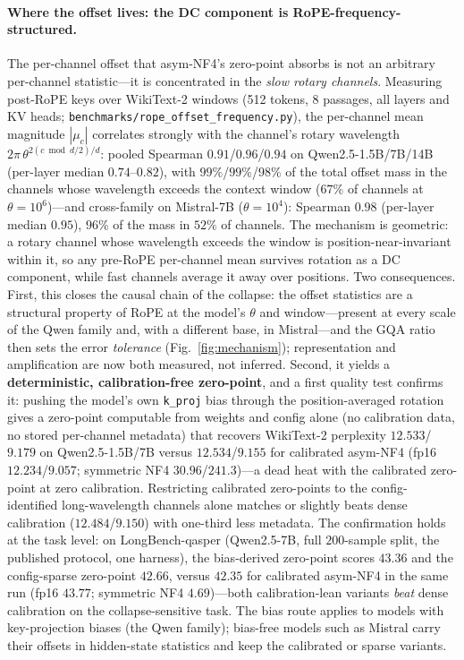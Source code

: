 \documentclass[11pt]{article}
\begin{document}
\paragraph{Where the offset lives: the DC component is RoPE-frequency-structured.}
The per-channel offset that asym-NF4's zero-point absorbs is not an arbitrary
per-channel statistic---it is concentrated in the \emph{slow rotary channels}.
Measuring post-RoPE keys over WikiText-2 windows (512 tokens, 8 passages,
all layers and KV heads; \texttt{benchmarks/rope\_offset\_frequency.py}), the
per-channel mean magnitude $|\mu_c|$ correlates strongly with the channel's
rotary wavelength $2\pi\,\theta^{2(c\bmod d/2)/d}$: pooled Spearman
$0.91$/$0.96$/$0.94$ on Qwen2.5-1.5B/7B/14B (per-layer median
$0.74$--$0.82$), with $99\%$/$99\%$/$98\%$ of the total offset mass in the
channels whose wavelength exceeds the context window ($67\%$ of channels at
$\theta{=}10^6$)---and cross-family on Mistral-7B ($\theta{=}10^4$): Spearman
$0.98$ (per-layer median $0.95$), $96\%$ of the mass in $52\%$ of channels.
The mechanism is geometric: a rotary channel whose wavelength exceeds the
window is position-near-invariant within it, so any pre-RoPE per-channel mean
survives rotation as a DC component, while fast channels average it away over
positions. Two consequences. First, this closes the causal chain of the
collapse: the offset statistics are a structural property of RoPE at the
model's $\theta$ and window---present at every scale of the Qwen family and,
with a different base, in Mistral---and the
GQA ratio then sets the error \emph{tolerance} (Fig.~\ref{fig:mechanism});
representation and amplification are now both measured, not inferred. Second,
it yields a \textbf{deterministic, calibration-free zero-point}, and a first
quality test confirms it: pushing the model's own \texttt{k\_proj} bias
through the position-averaged rotation gives a zero-point computable from
weights and config alone (no calibration data, no stored per-channel
metadata) that recovers WikiText-2 perplexity $12.533$/$9.179$ on
Qwen2.5-1.5B/7B versus $12.534$/$9.155$ for calibrated asym-NF4 (fp16
$12.234$/$9.057$; symmetric NF4 $30.96$/$241.3$)---a dead heat with the
calibrated zero-point at zero calibration. Restricting calibrated
zero-points to the config-identified long-wavelength channels alone matches
or slightly beats dense calibration ($12.484$/$9.150$) with one-third less
metadata. The confirmation holds at the task level: on LongBench-qasper
(Qwen2.5-7B, full $200$-sample split, the published protocol, one harness),
the bias-derived zero-point scores $\mathbf{43.36}$ and the config-sparse
zero-point $42.66$, versus $42.35$ for calibrated asym-NF4 in the same run
(fp16 $43.77$; symmetric NF4 $4.69$)---both calibration-lean variants
\emph{beat} dense calibration on the collapse-sensitive task. The bias route applies to models with key-projection biases (the
Qwen family); bias-free models such as Mistral carry their offsets in
hidden-state statistics and keep the calibrated or sparse variants.
\end{document}
